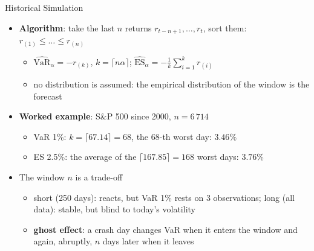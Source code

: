 \begin{frame}{Historical Simulation}
\itemsize{\footnotesize}
\begin{itemize}
    \item \textbf{Algorithm}: take the last $n$ returns $r_{t-n+1}, \dots, r_t$, sort them: $r_{(1)} \le \dots \le r_{(n)}$
    \begin{itemize}
        \item $\widehat{\mathrm{VaR}}_\alpha = -r_{(k)}$, $k = \lceil n\alpha \rceil$; \quad $\widehat{\mathrm{ES}}_\alpha = -\frac{1}{k}\sum_{i=1}^{k} r_{(i)}$
        \item no distribution is assumed: the empirical distribution of the window is the forecast
    \end{itemize}
    \item \textbf{Worked example}: S\&P 500 since 2000, $n = 6\,714$
    \begin{itemize}
        \item VaR 1\%: $k = \lceil 67.14 \rceil = 68$, the 68-th worst day: $3.46\%$
        \item ES 2.5\%: the average of the $\lceil 167.85 \rceil = 168$ worst days: $3.76\%$
    \end{itemize}
    \item The window $n$ is a trade-off
    \begin{itemize}
        \item short (250 days): reacts, but VaR 1\% rests on 3 observations; long (all data): stable, but blind to today's volatility
        \item \textbf{ghost effect}: a crash day changes VaR when it enters the window and again, abruptly, $n$ days later when it leaves
    \end{itemize}
\end{itemize}
\end{frame}

